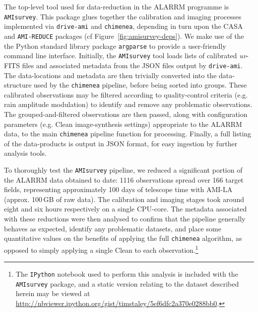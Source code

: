 \documentclass[5p,authoryear]{elsarticle}
\begin{document}
The top-level tool used for data-reduction in the ALARRM programme is \texttt{AMIsurvey}. 
This package glues together the calibration and imaging processes implemented via \texttt{drive-ami} and \texttt{chimenea}, depending in turn upon the CASA and \texttt{AMI-REDUCE} packages (cf Figure~\ref{fig:amisurvey-deps}). 
We make use of the the Python standard library package \texttt{argparse} to provide a user-friendly command line interface.
Initially, the \texttt{AMIsurvey} tool loads lists of calibrated \textit{uv}-FITS files and associated metadata from the JSON files output by \texttt{drive-ami}. 
The data-locations and metadata are then trivially converted into the data-structure used by the \texttt{chimenea} pipeline, before being sorted into groups. 
These calibrated observations may be filtered according to quality-control criteria (e.g. rain amplitude modulation) to identify and remove any problematic observations.
The grouped-and-filtered observations are then passed, along with configuration parameters (e.g. Clean image-synthesis settings) appropriate to the ALARRM data, to the main \texttt{chimenea} pipeline function for processing. 
Finally, a full listing of the data-products is output in JSON format, for easy ingestion by further analysis tools. 

To thoroughly test the \texttt{AMIsurvey} pipeline, we reduced a significant portion of the ALARRM data obtained to date: 1116 observations spread over 166 target fields, representing approximately 100 days of telescope time with AMI-LA (approx. 100\,GB of raw data). 
The calibration and imaging stages took around eight and six hours respectively on a single CPU-core. 
The metadata associated with these reductions were then analysed to confirm that the pipeline generally behaves as expected, identify any problematic datasets, and place some quantitative values on the benefits of applying the full \texttt{chimenea} algorithm, as opposed to simply applying a single Clean to each observation.\footnote{%
 The \texttt{IPython} notebook used to perform this analysis is included with the \texttt{AMIsurvey} package, and a static version relating to the dataset described herein may be viewed at  \url{http://nbviewer.ipython.org/gist/timstaley/5ef6dfc2a370e0288bb0}.
}
\end{document}
